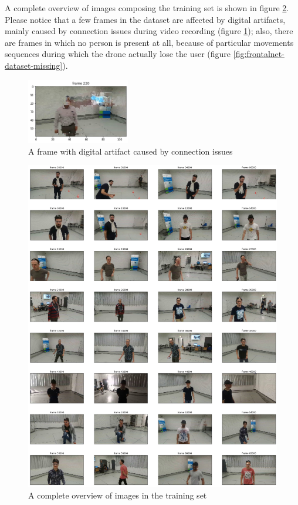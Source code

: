 A complete overview of images composing the training set is shown in figure \ref{fig:frontalnet-dataset-overview}. Please notice that a few frames in the dataset are affected by digital artifacts, mainly caused by connection issues during video recording (figure \ref{fig:frontalnet-dataset-glitch}); also, there are frames in which no person is present at all, because of particular movements sequences during which the drone actually lose the user (figure \ref{fig:frontalnet-dataset-missing}).

\begin{figure}[!htb]
	\centering
	\includegraphics[width=0.4\textwidth]{"contents/images/03-data-glitch"}
	\caption[A frame with digital artifact caused by connection issues]{A frame with digital artifact caused by connection issues}
	\label{fig:frontalnet-dataset-glitch}
\end{figure}

\clearpage
\vspace*{5ex}
\begin{figure}[!h]
	\centering
	\includegraphics[width=1\textwidth]{"contents/images/03-data-overview"}
	\caption[A complete overview of images in the training set]{A complete overview of images in the training set}
	\label{fig:frontalnet-dataset-overview}
\end{figure}
\clearpage

